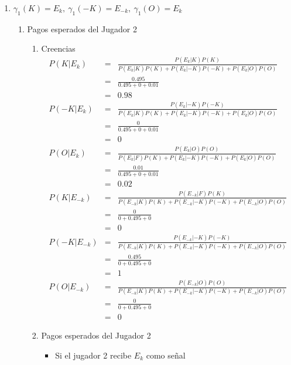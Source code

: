 {\begin{enumerate}
    \item $\gamma_1(K)=E_k, \ \gamma_1(-K)=E_{-k}, \ \gamma_1(O)=E_{k}$ %
    \begin{enumerate}
    \item Pagos esperados del Jugador 2
    \begin{enumerate}
        \item Creencias
            \begin{eqnarray*}
                P(K|E_k)&=&\frac{P(E_k|K)P(K)}{P(E_k|K)P(K)+P(E_k|-K)P(-K)+P(E_k|O)P(O)}\\
                        &=&\frac{0.495}{0.495+0+0.01}\\
                        &=&0.98\\
                P(-K|E_k)&=&\frac{P(E_k|-K)P(-K)}{P(E_k|K)P(K)+P(E_k|-K)P(-K)+P(E_k|O)P(O)}\\
                        &=&\frac{0}{0.495+0+0.01}\\
                        &=&0\\
                P(O|E_k)&=&\frac{P(E_k|O)P(O)}{P(E_k|F)P(K)+P(E_k|-K)P(-K)+P(E_k|O)P(O)}\\
                        &=&\frac{0.01}{0.495+0+0.01}\\
                        &=&0.02\\
                P(K|E_{-k})&=&\frac{P(E_{-k}|F)P(K)}{P(E_{-k}|K)P(K)+P(E_{-k}|-K)P(-K)+P(E_{-k}|O)P(O)}\\
                        &=&\frac{0}{0+0.495+0}\\
                        &=&0\\
                P(-K|E_{-k})&=&\frac{P(E_{-k}|-K)P(-K)}{P(E_{-k}|K)P(K)+P(E_{-k}|-K)P(-K)+P(E_{-k}|O)P(O)}\\
                        &=&\frac{0.495}{0+0.495+0}\\
                        &=&1\\
                P(O|E_{-k})&=&\frac{P(E_{-k}|O)P(O)}{P(E_{-k}|K)P(K)+P(E_{-k}|-K)P(-K)+P(E_{-k}|O)P(O)}\\
                        &=&\frac{0}{0+0.495+0}\\
                        &=&0
            \end{eqnarray*}
        \item Pagos esperados del Jugador 2
        \begin{itemize}
           \item Si el jugador 2 recibe $E_k$ como señal
            \begin{eqnarray*}

\end{eqnarray*}
\end{itemize}
\end{enumerate}
\end{enumerate}
\end{enumerate}}
